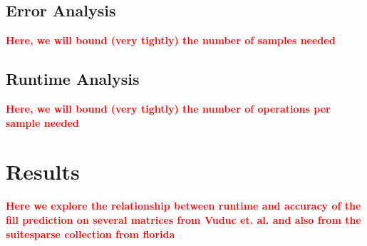 \documentclass[12pt]{article}
\newcommand{\todo}[1] {\textbf{\textcolor{red}{#1}}}
\begin{document}
    \subsection{Error Analysis}
      \todo{Here, we will bound (very tightly) the number of samples needed}
    \subsection{Runtime Analysis}
      \todo{Here, we will bound (very tightly) the number of operations per sample needed}

  \section{Results}
    \todo{Here we explore the relationship between runtime and accuracy of the fill prediction on several matrices from Vuduc et. al. and also from the suitesparse collection from florida}
\end{document}
